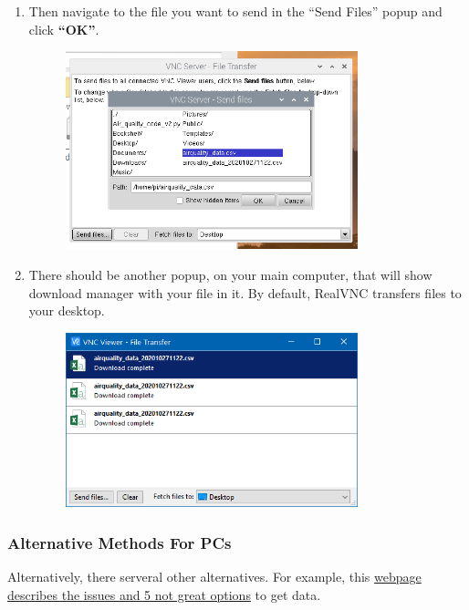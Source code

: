 \documentclass{article}\usepackage[]{graphicx}\usepackage[]{color}
\begin{document}
\begin{enumerate}
\item Then navigate to the file you want to send in the ``Send Files'' popup and click \textbf{``OK''}.
\begin{figure}[h!]
\centering
\includegraphics[width=0.80\textwidth]{images/4_vncserver_sf}
\caption{}
\label{fig:vncserversendfiles}
\end{figure}

\item There should be another popup, on your main computer, that will show download manager with your file in it. By default, RealVNC transfers files to your desktop.
\begin{figure}[h!]
\centering
\includegraphics[width=0.80\textwidth]{images/4_vncserver_sfdm}

\label{fig:vncserverdownloadmanager}
\end{figure}

\end{enumerate}

\subsubsection{Alternative Methods For PCs} 

Alternatively, there serveral other alternatives. For example, this \href{https://www.makeuseof.com/tag/copy-data-raspberry-pi-pc/}{webpage describes the issues and 5 not great options} to get data. 
\end{document}
